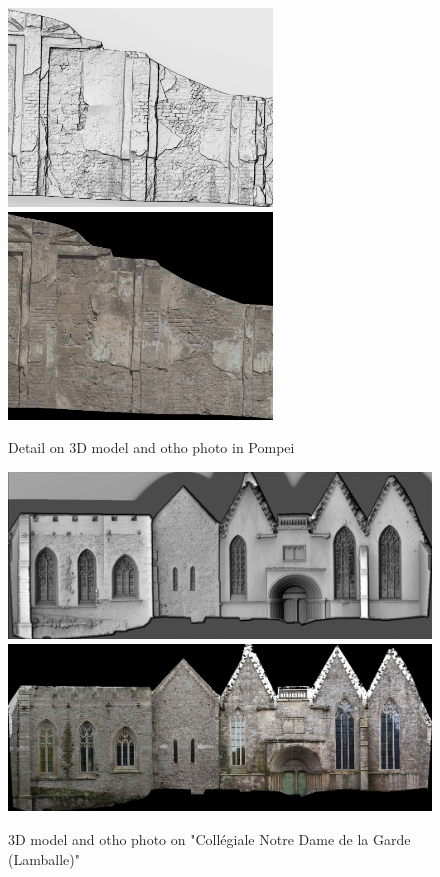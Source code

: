 \begin{figure}
\includegraphics[width=70mm]{FIGS/SAMPLES/Pompei-Shade1.jpg}
\includegraphics[width=70mm]{FIGS/SAMPLES/Pompei-Ortho2.jpg}
\caption{Detail on 3D model and otho photo in Pompei}
\end{figure}


\begin{figure}
\includegraphics[width=150mm]{FIGS/SAMPLES/LambaleShade.jpg}
\includegraphics[width=150mm]{FIGS/SAMPLES/Lamballe-Ortho-Test-Redr.jpg}
\caption{3D model and otho photo on "Collégiale Notre Dame de la Garde (Lamballe)"}
\end{figure}





